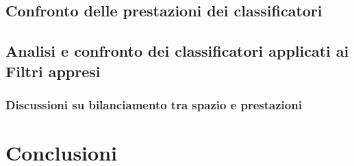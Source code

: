 \documentclass{article}
\begin{document}
\subsection{Confronto delle prestazioni dei classificatori}
\subsection{Analisi e confronto dei classificatori applicati ai Filtri appresi}
\subsubsection{Discussioni su bilanciamento tra spazio e prestazioni}

\section{Conclusioni}
\end{document}
